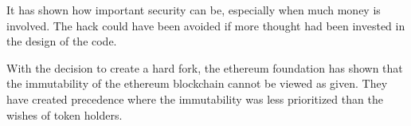 \documentclass[a4paper, 11pt]{scrartcl}
\begin{document}
It has shown how important security can be, especially when much money is involved. The hack could have been avoided if more thought had been invested in the design of the code. 

With the decision to create a hard fork, the ethereum foundation has shown that the immutability of the ethereum blockchain cannot be viewed as given. They have created precedence where the immutability was less prioritized than the wishes of token holders.

\nocite{*}
\clearpage
\printbibliography[heading=bibintoc]
\end{document}
